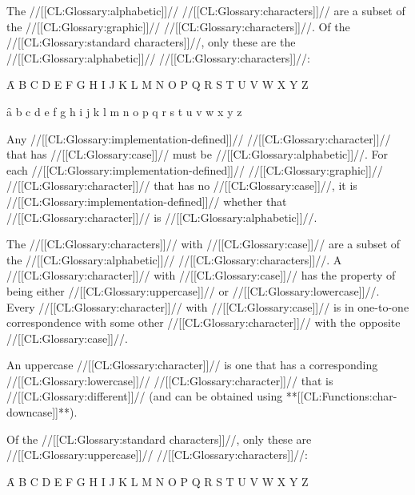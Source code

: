 \endsubsubsection%



The //[[CL:Glossary:alphabetic]]// //[[CL:Glossary:characters]]// are
a subset of the //[[CL:Glossary:graphic]]// //[[CL:Glossary:characters]]//.
Of the //[[CL:Glossary:standard characters]]//, only these are the //[[CL:Glossary:alphabetic]]// //[[CL:Glossary:characters]]//:

\f{A B C D E F G H I J K L M N O P Q R S T U V W X Y Z}

\f{a b c d e f g h i j k l m n o p q r s t u v w x y z}


Any //[[CL:Glossary:implementation-defined]]// //[[CL:Glossary:character]]// that has //[[CL:Glossary:case]]// 
must be //[[CL:Glossary:alphabetic]]//.
For each //[[CL:Glossary:implementation-defined]]// //[[CL:Glossary:graphic]]// //[[CL:Glossary:character]]// 
that has no //[[CL:Glossary:case]]//,
it is //[[CL:Glossary:implementation-defined]]// whether 
that //[[CL:Glossary:character]]// is //[[CL:Glossary:alphabetic]]//.

\endsubsubsection%


The //[[CL:Glossary:characters]]// with //[[CL:Glossary:case]]// are 
a subset of the //[[CL:Glossary:alphabetic]]// //[[CL:Glossary:characters]]//.
A //[[CL:Glossary:character]]// with //[[CL:Glossary:case]]// has the property of being either
//[[CL:Glossary:uppercase]]// or //[[CL:Glossary:lowercase]]//.
Every //[[CL:Glossary:character]]// with //[[CL:Glossary:case]]// is in one-to-one correspondence
with some other //[[CL:Glossary:character]]// with the opposite //[[CL:Glossary:case]]//.




An uppercase //[[CL:Glossary:character]]// is one that has a corresponding
//[[CL:Glossary:lowercase]]// //[[CL:Glossary:character]]// that is //[[CL:Glossary:different]]// 
(and can be obtained using **[[CL:Functions:char-downcase]]**).

Of the //[[CL:Glossary:standard characters]]//, only these are //[[CL:Glossary:uppercase]]// //[[CL:Glossary:characters]]//:

\f{A B C D E F G H I J K L M N O P Q R S T U V W X Y Z}

